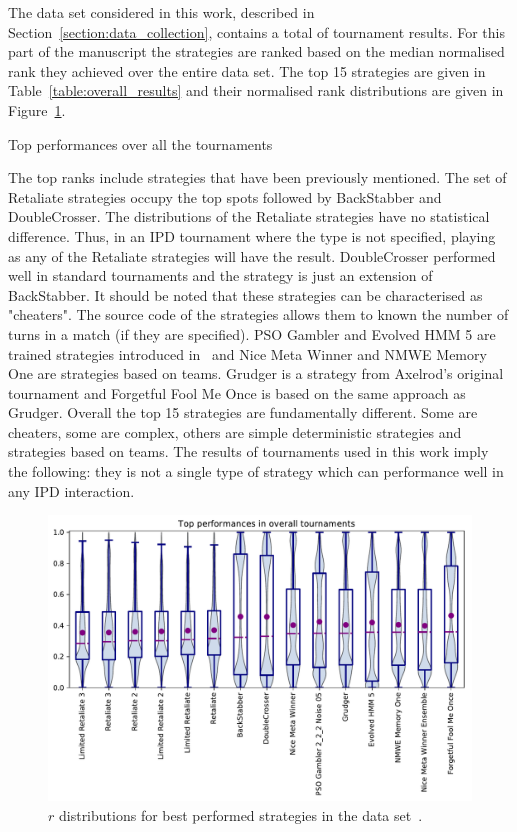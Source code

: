 \documentclass{article}
\newcommand{\numberofalltournaments}{}
\begin{document}
The data set considered in this work, described in
Section~\ref{section:data_collection}, contains a total of \numberofalltournaments
tournament results. For this part of the manuscript the strategies are ranked
based on the median normalised rank they achieved over the entire data set.
The top 15 strategies are given in Table~\ref{table:overall_results}
and their normalised rank distributions are given in Figure~\ref{fig:overall_results}.

\begin{table}[!htbp]
    \centering
    \resizebox{.35\textwidth}{!}{
    }
    \caption{Top performances over all the tournaments}\label{table:overall_results}
\end{table}

The top ranks include strategies that have been previously mentioned. The
set of Retaliate strategies occupy the top spots followed by BackStabber
and DoubleCrosser. The distributions of the Retaliate strategies have no
statistical difference. Thus, in an IPD tournament where the type is not
specified, playing as any of the Retaliate strategies will have the result.
DoubleCrosser performed well in standard tournaments and the
strategy is just an extension of BackStabber. It should be noted that these
strategies can be characterised as "cheaters". The source code of the strategies
allows them to known the number of turns in a match (if they are specified).
PSO Gambler and Evolved HMM 5 are
trained strategies introduced in~\cite{Harper2017} and Nice Meta Winner and NMWE
Memory One are strategies based on teams. Grudger is a strategy from Axelrod's
original tournament and Forgetful Fool Me Once is based on the same approach as
Grudger. Overall the top 15 strategies are fundamentally different. Some are cheaters,
some are complex, others are simple deterministic strategies and strategies based
on teams. The results of \numberofalltournaments tournaments used in this work imply the following:
they is not a single type of strategy which can performance well in any IPD interaction.

\begin{figure}[!htbp]
    \centering
    \includegraphics[width=.7\textwidth]{../images/performance_merged.pdf}
    \caption{\(r\) distributions for best performed strategies in the data set~\cite{data}.}
    \label{fig:overall_results}
\end{figure}
\end{document}
